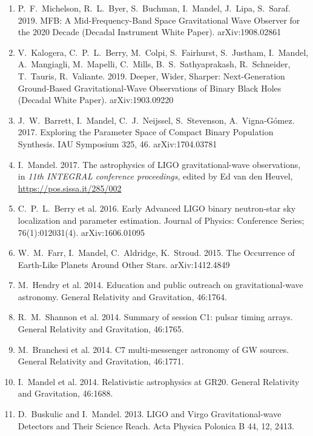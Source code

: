 \documentclass[margin,line]{res}
\begin{document}
\begin{resume}
\begin{enumerate}
\item P.~F.~Michelson, R.~L.~Byer, S.~Buchman, I.~Mandel, J.~Lipa, S.~Saraf.  2019. MFB: A Mid-Frequency-Band Space Gravitational Wave Observer for the 2020 Decade (Decadal Instrument White Paper). arXiv:1908.02861 

\item V.~Kalogera, C.~P.~L.~Berry, M.~Colpi, S.~Fairhurst, S.~Justham, I.~Mandel, A.~Mangiagli, M.~Mapelli, C.~Mills, B.~S.~Sathyaprakash, R.~Schneider, T.~Tauris, R.~Valiante. 2019.  Deeper, Wider, Sharper: Next-Generation Ground-Based Gravitational-Wave Observations of Binary Black Holes (Decadal White Paper).  arXiv:1903.09220 

\item J.~W.~Barrett, I.~Mandel, C.~J.~Neijssel, S.~Stevenson, A.~Vigna-G\'{o}mez. 2017. Exploring the Parameter Space of Compact Binary Population Synthesis. IAU Symposium 325, 46. arXiv:1704.03781 

\item I.~Mandel.  2017. The astrophysics of LIGO gravitational-wave observations, in {\it 11th INTEGRAL conference proceedings}, edited by Ed van den Heuvel, \url{https://pos.sissa.it/285/002}

\item C.~P.~L.~Berry et al.  2016.  Early Advanced LIGO binary neutron-star sky localization and parameter estimation.  Journal of Physics: Conference Series; 76(1):012031(4).  arXiv:1606.01095

\item W.~M.~Farr, I.~Mandel, C.~Aldridge, K.~Stroud. 2015. The Occurrence of Earth-Like Planets Around Other Stars.  arXiv:1412.4849
  
\item M.~Hendry et al. 2014. Education and public outreach on gravitational-wave astronomy.  General Relativity and Gravitation, 46:1764.

\item R.~M.~Shannon et al. 2014. Summary of session C1: pulsar timing arrays. General Relativity and Gravitation, 46:1765.

\item M.~Branchesi et al. 2014.  C7 multi-messenger astronomy of GW sources.
General Relativity and Gravitation, 46:1771.

\item I.~Mandel et al.  2014.  Relativistic astrophysics at GR20.  General Relativity and Gravitation, 46:1688.

\item D.~Buskulic and I.~Mandel.  2013.  LIGO and Virgo Gravitational-wave Detectors and Their Science Reach.  Acta Physica Polonica B 44, 12, 2413.


\end{enumerate}
\end{resume}
\end{document}
